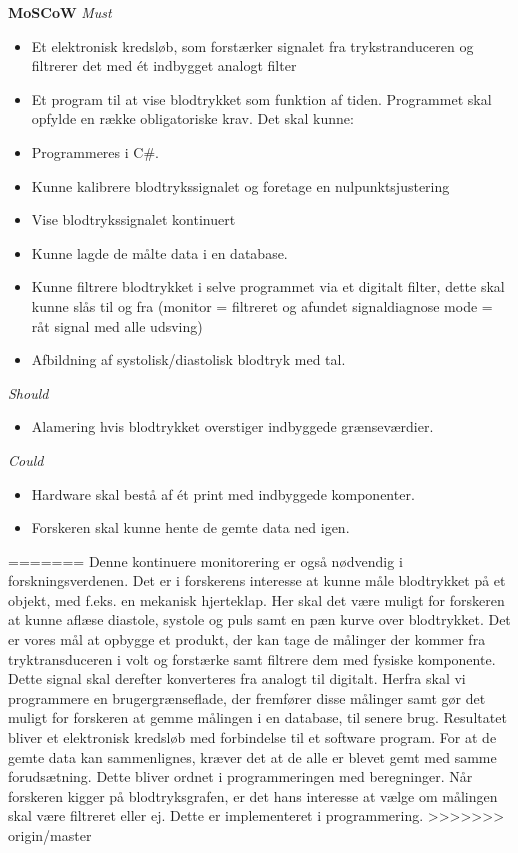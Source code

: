 \textbf{MoSCoW}
\textit{Must}
\begin{itemize}
\item Et elektronisk kredsløb, som forstærker signalet fra trykstranduceren og filtrerer det med ét indbygget analogt filter
\item Et program til at vise blodtrykket som funktion af tiden. Programmet skal opfylde en række obligatoriske krav. Det skal kunne:
\end{itemize}
\begin{itemize}
\item Programmeres i C#.
\item Kunne kalibrere blodtrykssignalet og foretage en nulpunktsjustering
\item Vise blodtrykssignalet kontinuert
\item Kunne lagde de målte data i en database.
\item Kunne filtrere blodtrykket i selve programmet via et digitalt filter, dette skal kunne slås til og fra (monitor = filtreret og afundet signaldiagnose mode = råt signal med alle udsving)
\item Afbildning af systolisk/diastolisk blodtryk med tal.
\end{itemize}
\textit{Should}
\begin{itemize}
\item Alamering hvis blodtrykket overstiger indbyggede grænseværdier.
\end{itemize}
\textit{Could}
\begin{itemize}
\item Hardware skal bestå af ét print med indbyggede komponenter.
\item Forskeren skal kunne hente de gemte data ned igen.
\end{itemize}
=======
Denne kontinuere monitorering er også nødvendig i forskningsverdenen. Det er i forskerens interesse at kunne måle blodtrykket på et objekt, med f.eks. en mekanisk hjerteklap. Her skal det være muligt for forskeren at kunne aflæse diastole, systole og puls samt en pæn kurve over blodtrykket. Det er vores mål at opbygge et produkt, der kan tage de målinger der kommer fra tryktransduceren i volt og forstærke samt filtrere dem med fysiske komponente. Dette signal skal derefter konverteres fra analogt til digitalt. Herfra skal vi programmere en brugergrænseflade, der fremfører disse målinger samt gør det muligt for forskeren at gemme målingen i en database, til senere brug. Resultatet bliver et elektronisk kredsløb med forbindelse til et software program.
For at de gemte data kan sammenlignes, kræver det at de alle er blevet gemt med samme forudsætning. Dette bliver ordnet i programmeringen med beregninger. Når forskeren kigger på blodtryksgrafen, er det hans interesse at vælge om målingen skal være filtreret eller ej. Dette er implementeret i programmering. 
>>>>>>> origin/master
